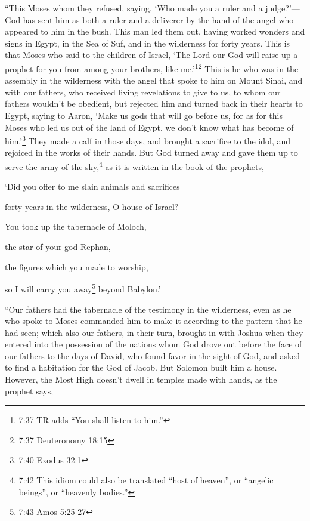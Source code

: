 \myverse{}“This Moses whom they refused, saying, ‘Who made you a ruler
and a judge?’—God has sent him as both a ruler and a deliverer by the hand of the angel who appeared to
him in the bush.
\myverse{}This man led them out, having worked wonders and signs in Egypt, in the Sea of Suf,
and in the wilderness for forty years.
\myverse{}This is that Moses who said to the children of Israel, ‘The Lord our God will
raise up a prophet for you from among your brothers, like me.’\footnote{7:37 TR adds “You shall listen to him.”}\footnote{7:37 Deuteronomy 18:15}
\myverse{}This is he who was in the assembly in the wilderness with the angel that spoke
to him on Mount Sinai, and with our fathers, who received living revelations to give to us,
\myverse{}to whom our fathers wouldn’t be obedient, but rejected him and turned back
in their hearts to Egypt,
\myverse{}saying to Aaron, ‘Make us gods that will go before us, for as for this Moses
who led us out of the land of Egypt, we don’t know what has become of him.’\footnote{7:40 Exodus 32:1}
\myverse{}They made a calf in those days, and brought a sacrifice to the idol, and rejoiced
in the works of their hands.
\myverse{}But God turned away and gave them up to serve the army of the sky,\footnote{7:42 This idiom could also be translated “host of heaven”, or “angelic beings”, or “heavenly bodies.”}
as it is written in the book of the prophets,

‘Did you offer to me slain animals and sacrifices

forty years in the wilderness, O house of Israel?

\myverse{}You took up the tabernacle of Moloch,

the star of your god Rephan,

the figures which you made to worship,

so I will carry you away\footnote{7:43 Amos 5:25-27} beyond Babylon.’

\myverse{}“Our fathers had the tabernacle of the testimony in the wilderness,
even as he who spoke to Moses commanded him to make it according to the pattern that he had seen;
\myverse{}which also our fathers, in their turn, brought in with Joshua when they entered
into the possession of the nations whom God drove out before the face of our fathers to the days of David,
\myverse{}who found favor in the sight of God, and asked to find a habitation for the
God of Jacob.
\myverse{}But Solomon built him a house.
\myverse{}However, the Most High doesn’t dwell in temples made with hands, as the prophet
says,

